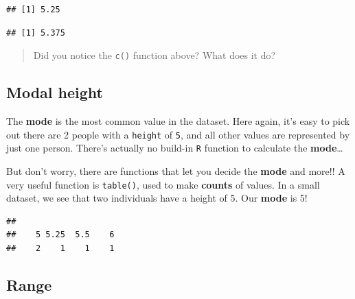 \documentclass[
]{book}
\newenvironment{Shaded}{\begin{snugshade}}{\end{snugshade}}
\newcommand{\DocumentationTok}[1]{\textcolor[rgb]{0.56,0.35,0.01}{\textbf{\textit{#1}}}}
\newcommand{\FloatTok}[1]{\textcolor[rgb]{0.00,0.00,0.81}{#1}}
\newcommand{\FunctionTok}[1]{\textcolor[rgb]{0.13,0.29,0.53}{\textbf{#1}}}
\newcommand{\NormalTok}[1]{#1}
\newcommand{\SpecialCharTok}[1]{\textcolor[rgb]{0.81,0.36,0.00}{\textbf{#1}}}
\begin{document}
\begin{verbatim}
## [1] 5.25
\end{verbatim}

\begin{Shaded}
\end{Shaded}

\begin{verbatim}
## [1] 5.375
\end{verbatim}

\begin{quote}
Did you notice the \texttt{c()} function above? What does it do?
\end{quote}

\hypertarget{modal-height}{%
\subsection{Modal height}\label{modal-height}}

The \textbf{mode} is the most common value in the dataset. Here again, it's easy to pick out there are 2 people with a \texttt{height} of \texttt{5}, and all other values are represented by just one person. There's actually no build-in \texttt{R} function to calculate the \textbf{mode}\ldots{}

But don't worry, there are functions that let you decide the \textbf{mode} and more!! A very useful function is \texttt{table()}, used to make \textbf{counts} of values. In a small dataset, we see that two individuals have a height of 5. Our \textbf{mode} is 5!

\begin{Shaded}
\end{Shaded}

\begin{verbatim}
## 
##    5 5.25  5.5    6 
##    2    1    1    1
\end{verbatim}

\hypertarget{range}{%
\subsection{Range}\label{range}}
\end{document}
